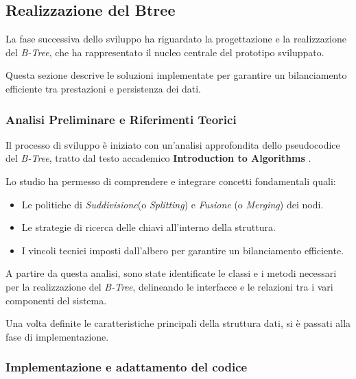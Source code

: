 \documentclass[12pt,a4paper,openright,twoside]{book}
\begin{document}
        \clearpage

        \subsection{Realizzazione del Btree}

            La fase successiva dello sviluppo ha riguardato la progettazione e la realizzazione del \textit{B-Tree}, che ha rappresentato il nucleo centrale del prototipo sviluppato.

            Questa sezione descrive le soluzioni implementate per garantire un bilanciamento efficiente tra prestazioni e persistenza dei dati.

            \subsubsection{Analisi Preliminare e Riferimenti Teorici}

                Il processo di sviluppo è iniziato con un'analisi approfondita dello pseudocodice del \textit{B-Tree}, tratto dal testo accademico \textbf{Introduction to Algorithms} \cite{cormen2022introduction}.

                Lo studio ha permesso di comprendere e integrare concetti fondamentali quali:
                \begin{itemize}
                    \item Le politiche di \textit{Suddivisione}(o \textit{Splitting}) e \textit{Fusione} (o \textit{Merging}) dei nodi.
                    \item Le strategie di ricerca delle chiavi all'interno della struttura.
                    \item I vincoli tecnici imposti dall'albero per garantire un bilanciamento efficiente.
                \end{itemize}

                A partire da questa analisi, sono state identificate le classi e i metodi necessari per la realizzazione del \textit{B-Tree}, delineando le interfacce e le relazioni tra i vari componenti del sistema.

                Una volta definite le caratteristiche principali della struttura dati, si è passati alla fase di implementazione.

            \subsubsection{Implementazione e adattamento del codice}
\end{document}
